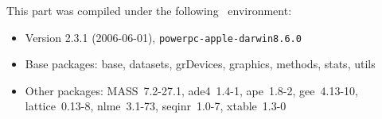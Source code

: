 \documentclass{article}
\begin{document}
This part was compiled under the following \Rlogo{}~environment:

\begin{itemize}
  \item Version 2.3.1 (2006-06-01), \verb|powerpc-apple-darwin8.6.0|
  \item Base packages: base, datasets, grDevices, graphics, methods,
    stats, utils
  \item Other packages: MASS~7.2-27.1, ade4~1.4-1, ape~1.8-2,
    gee~4.13-10, lattice~0.13-8, nlme~3.1-73, seqinr~1.0-7,
    xtable~1.3-0
\end{itemize}


\clearpage
{}


\end{document}
